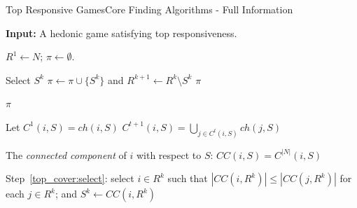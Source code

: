 \documentclass[xcolor=dvipsnames]{beamer}
\newcommand{\ch}{\mathit{ch}}
\newcommand{\CC}{\mathit{CC}}
\begin{document}
\begin{frame}{Top Responsive Games}{Core Finding Algorithms - Full Information}
  \begin{algorithm}[H]
    \small
    \caption{Top Covering Algorithm}
    \label{alg:top_covering}
    \textbf{Input:} A hedonic game satisfying top responsiveness.

    \begin{algorithmic}[1]
    \State $R^1 \leftarrow N$; $\pi \leftarrow \emptyset$.

      \State \label{top_cover:select} Select $S^k$
      \State \label{top_cover:remove} $\pi \leftarrow \pi \cup \lbrace S^k \rbrace$ and $R^{k+1} \leftarrow  R^k \setminus S^k$
        \State \Return $\pi$
      \EndIf
    \EndFor

    \State \Return $\pi$
   \end{algorithmic}
  \end{algorithm}

  \small
  Let $C^1(i, S) = \ch(i, S)$ 
  $C^{t + 1}(i, S) = \underset{j \in C^t(i, S)}{\bigcup} \ch(j, S)$ 

  The \textit{connected component} of $i$ with respect to $S$: $\CC(i, S) = C^{|N|}(i, S)$

  Step~\ref{top_cover:select}: select $i\in R^k$ such
  that $|\CC(i,R^k)| \leq |\CC(j,R^k)|$ for each $j\in R^k$;
  and $S^k\leftarrow \CC(i,R^k)$
\end{frame}
\end{document}
